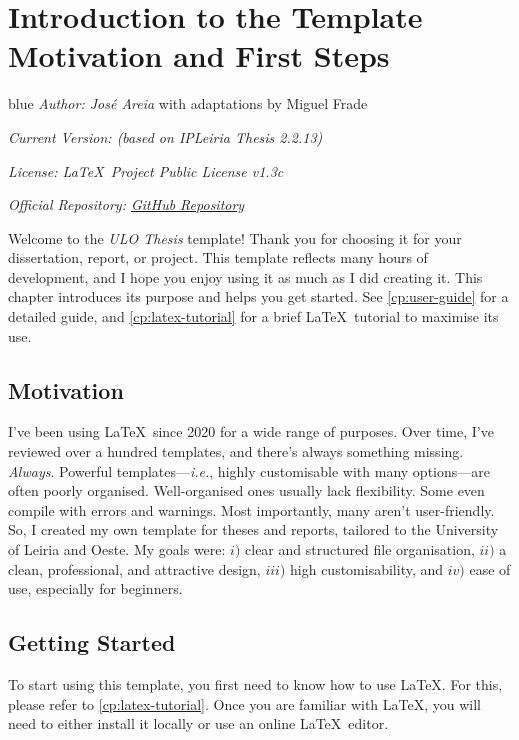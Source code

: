 \chapter[Introduction to the Template: Motivation and First Steps]{Introduction to the Template Motivation and First Steps}
\label{cp:introduction}

{ %
\parindent0pt

\begin{color}{blue}
\textit{Author: José Areia} with adaptations by Miguel Frade

\textit{Current Version: \TemplateVersion{} (based on IPLeiria Thesis 2.2.13)}

\textit{License: \LaTeX~Project Public License v1.3c}

\textit{Official Repository: \href{https://github.com/mfrade/ULO-thesis}{GitHub Repository}}
\end{color}

\vspace{.935em}

Welcome to the \textcolor{maincolor}{\textit{ULO Thesis}} template! Thank you for choosing it for your dissertation, report, or project. This template reflects many hours of development, and I hope you enjoy using it as much as I did creating it. This chapter introduces its purpose and helps you get started. See \autoref{cp:user-guide} for a detailed guide, and \autoref{cp:latex-tutorial} for a brief \LaTeX~tutorial to maximise its use.
}

\section{Motivation}
I've been using \LaTeX~since 2020 for a wide range of purposes. Over time, I've reviewed over a hundred templates, and there's always something missing. \textit{Always}. Powerful templates---\textit{i.e.}, highly customisable with many options---are often poorly organised. Well-organised ones usually lack flexibility. Some even compile with errors and warnings. Most importantly, many aren't user-friendly. So, I created my own template for theses and reports, tailored to the University of Leiria and Oeste. My goals were: \(i)\) clear and structured file organisation, \(ii)\) a clean, professional, and attractive design, \(iii)\) high customisability, and \(iv)\) ease of use, especially for beginners.


\section{Getting Started}
To start using this template, you first need to know how to use \LaTeX. For this, please refer to \autoref{cp:latex-tutorial}. Once you are familiar with \LaTeX, you will need to either install it locally or use an online \LaTeX~editor.

